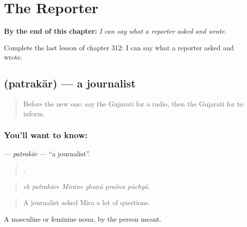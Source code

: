
\chapter{The Reporter}
\label{ch:gu-the-reporter}

\begin{chapteropening}
\textbf{By the end of this chapter:} \emph{I can say what a reporter asked and wrote.}

Complete the last lesson of chapter 312: I can say what a reporter asked and wrote.
\end{chapteropening}

\section[\texorpdfstring{\gu{પત્રકાર} (patrakār)}{પત્રકાર (patrakār)}]{ (patrakār) — a journalist}

\label{lesson:GU-C312-patrakar}



\begin{quote}
Before the new one: say the Gujarati for a radio, then the Gujarati for to inform.
\end{quote}

\subsection*{You'll want to know: }
\textbf{} — \emph{patrakār} — \textquotedblleft{}a journalist\textquotedblright{}.

\begin{quote}
     .
\end{quote}

\begin{quote}
\emph{ek patrakāre Mīrāne ghaṇā praśna pūchyā.}
\end{quote}

\begin{quote}
A journalist asked Mira a lot of questions.
\end{quote}

A masculine or feminine noun, by the person meant.

